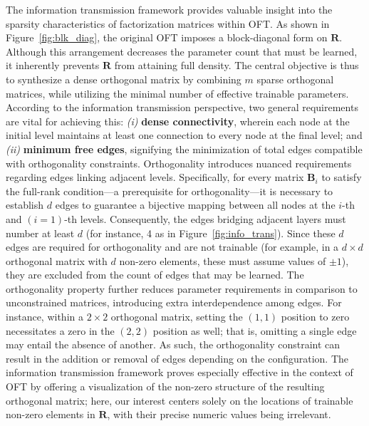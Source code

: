 The information transmission framework provides valuable insight into the sparsity characteristics of factorization matrices within OFT. As shown in Figure~\ref{fig:blk_diag}, the original OFT imposes a block-diagonal form on $\bm{R}$. Although this arrangement decreases the parameter count that must be learned, it inherently prevents $\bm{R}$ from attaining full density. The central objective is thus to synthesize a dense orthogonal matrix by combining $m$ sparse orthogonal matrices, while utilizing the minimal number of effective trainable parameters. According to the information transmission perspective, two general requirements are vital for achieving this: \emph{(i)} \textbf{dense connectivity}, wherein each node at the initial level maintains at least one connection to every node at the final level; and \emph{(ii)} \textbf{minimum free edges}, signifying the minimization of total edges compatible with orthogonality constraints. Orthogonality introduces nuanced requirements regarding edges linking adjacent levels. Specifically, for every matrix $\bm{B}_i$ to satisfy the full-rank condition—a prerequisite for orthogonality—it is necessary to establish $d$ edges to guarantee a bijective mapping between all nodes at the $i$-th and $(i=1)$-th levels. Consequently, the edges bridging adjacent layers must number at least $d$ (for instance, 4 as in Figure~\ref{fig:info_trans}). Since these $d$ edges are required for orthogonality and are not trainable (for example, in a $d\times d$ orthogonal matrix with $d$ non-zero elements, these must assume values of $\pm 1$), they are excluded from the count of edges that may be learned. The orthogonality property further reduces parameter requirements in comparison to unconstrained matrices, introducing extra interdependence among edges. For instance, within a $2\times 2$ orthogonal matrix, setting the $(1,1)$ position to zero necessitates a zero in the $(2,2)$ position as well; that is, omitting a single edge may entail the absence of another. As such, the orthogonality constraint can result in the addition or removal of edges depending on the configuration. The information transmission framework proves especially effective in the context of OFT by offering a visualization of the non-zero structure of the resulting orthogonal matrix; here, our interest centers solely on the locations of trainable non-zero elements in $\bm{R}$, with their precise numeric values being irrelevant.

